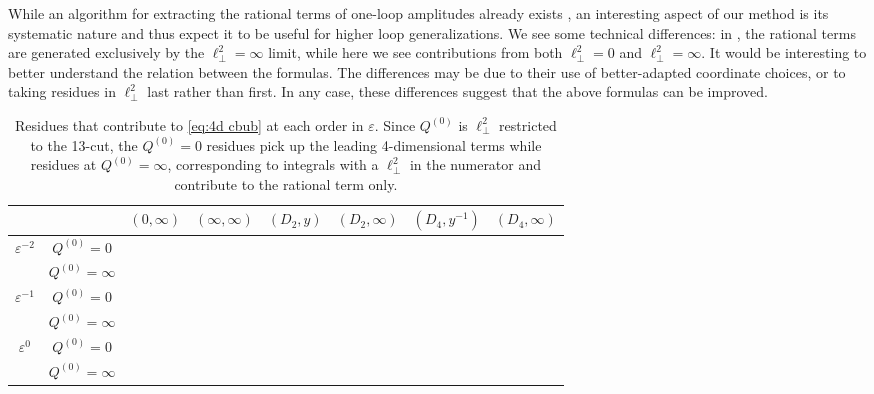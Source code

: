 \documentclass[11pt]{article}
\newcommand{\cmark}{\ding{51}}%
\newcommand{\vep}{\varepsilon}
\begin{document}
While an algorithm for extracting the rational terms of one-loop amplitudes already exists \cite{Badger:2008cm,Giele:2008ve}, an interesting aspect of our method is its
systematic nature and thus expect it to be useful for higher loop generalizations.
We see some technical differences: in \cite{Badger:2008cm,Giele:2008ve}, the rational terms are generated exclusively by the $\ell_\perp^2=\infty$ limit,
while here we see contributions from both $\ell_\perp^2=0$ and $\ell_\perp^2=\infty$.
It would be interesting to better understand the relation between the formulas. 
The differences may be due to their use of better-adapted coordinate choices,
or to taking residues in $\ell_\perp^2$ last rather than first. 
In any case, these differences suggest that the above formulas can be improved.

\begin{table}
\def\myxmark{}
	\centering
	\bgroup
	\def\arraystretch{1.5}%
	\begin{tabular}{c|c|c|c|c|c|c|c}
	 \multicolumn{2}{c|}{} & $(0,\infty)$ & $(\infty,\infty)$ & $(D_2,y)$ & $(D_2,\infty)$ & $(D_4,y^{-1})$ & $(D_4,\infty)$
	\\\hline
	 \multirow{2}{*}{$\vep^{-2}$} 
	 	& $Q^{(0)}=0$ & 
		\myxmark & \myxmark & \cmark & \myxmark & \cmark & \myxmark
	\\
		& $Q^{(0)}=\infty$ & 
		\myxmark & \myxmark & \myxmark & \myxmark & \myxmark & \myxmark
	\\\hline
	 \multirow{2}{*}{$\vep^{-1}$} 
	 	& $Q^{(0)}=0$ & 
		\myxmark & \cmark & \myxmark & \cmark & \myxmark & \cmark
	\\
		& $Q^{(0)}=\infty$ & 
		\myxmark & \myxmark & \myxmark & \myxmark & \myxmark & \myxmark
	\\\hline
	 \multirow{2}{*}{$\vep^{0}$} 
	 	& $Q^{(0)}=0$ & 
		\myxmark & \cmark & \myxmark & \cmark & \myxmark & \cmark
	\\
		& $Q^{(0)}=\infty$ & 
		\myxmark & \cmark & \myxmark & \cmark & \myxmark & \cmark
	\end{tabular}
	\egroup 
	\caption{  \label{tab:res chart}
		Residues that contribute to \eqref{eq:4d cbub} at each order in $\vep$.
		Since $Q^{(0)}$ is $\ell_\perp^2$ restricted to the 13-cut, the $Q^{(0)}=0$ residues
		pick up the leading 4-dimensional terms while residues at $Q^{(0)}=\infty$,
		corresponding to integrals with a $\ell_\perp^2$ in the numerator and 
		contribute to the rational term only.
	}
\end{table}
\end{document}
